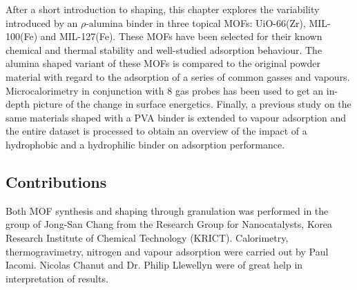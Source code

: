 After a short introduction to shaping, this chapter explores the 
variability introduced by an \( \rho \)-alumina binder in three 
topical \glspl{MOF}: UiO-66(Zr), MIL-100(Fe) and MIL-127(Fe). These \glspl{MOF} 
have been selected for their known chemical and thermal stability 
and well-studied adsorption behaviour.
The alumina shaped variant of these \glspl{MOF} is compared to the original
powder material with regard to the adsorption of a series of common
gasses and vapours. Microcalorimetry in conjunction with 8 gas probes
has been used to get an in-depth picture of the change in surface
energetics.
Finally, a previous study on the same materials shaped with a \gls{PVA}
binder is extended to vapour adsorption and the entire
dataset is processed to obtain an overview of the impact of a
hydrophobic and a hydrophilic binder on adsorption performance.

\subsection*{Contributions}

Both \gls{MOF} synthesis and shaping through granulation was performed in
the group of Jong-San Chang from the Research Group for Nanocatalysts,
Korea Research Institute of Chemical Technology (KRICT). Calorimetry,
thermogravimetry, nitrogen and vapour adsorption were carried out by
Paul Iacomi. Nicolas Chanut and Dr. Philip Llewellyn were of great help
in interpretation of results.

